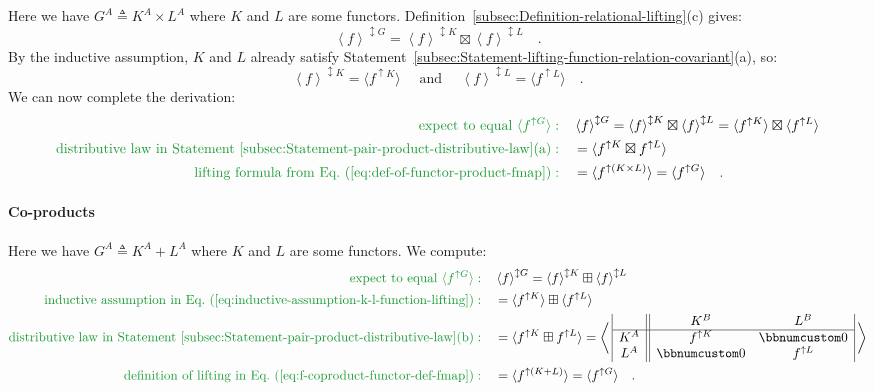 Here we have $G^{A}\triangleq K^{A}\times L^{A}$ where $K$ and $L$
are some functors. Definition~\ref{subsec:Definition-relational-lifting}(c)
gives:
\[
\left<f\right>^{\updownarrow G}=\left<f\right>^{\updownarrow K}\boxtimes\left<f\right>^{\updownarrow L}\quad.
\]
By the inductive assumption, $K$ and $L$ already satisfy Statement~\ref{subsec:Statement-lifting-function-relation-covariant}(a),
so:
\begin{equation}
\left<f\right>^{\updownarrow K}=\langle f^{\uparrow K}\rangle\quad\text{ and }\quad\left<f\right>^{\updownarrow L}=\langle f^{\uparrow L}\rangle\quad.\label{eq:inductive-assumption-k-l-function-lifting}
\end{equation}
We can now complete the derivation:
\begin{align*}
{\color{greenunder}\text{expect to equal }\langle f^{\uparrow G}\rangle:}\quad & \left<f\right>^{\updownarrow G}=\left<f\right>^{\updownarrow K}\boxtimes\left<f\right>^{\updownarrow L}=\langle f^{\uparrow K}\rangle\boxtimes\langle f^{\uparrow L}\rangle\\
{\color{greenunder}\text{distributive law in Statement~\ref{subsec:Statement-pair-product-distributive-law}(a)}:}\quad & =\langle f^{\uparrow K}\boxtimes f^{\uparrow L}\rangle\\
{\color{greenunder}\text{lifting formula from Eq.~(\ref{eq:def-of-functor-product-fmap})}:}\quad & =\langle f^{\uparrow(K\times L)}\rangle=\langle f^{\uparrow G}\rangle\quad.
\end{align*}


\paragraph{Co-products}

Here we have $G^{A}\triangleq K^{A}+L^{A}$ where $K$ and $L$ are
some functors. We compute:
\begin{align*}
{\color{greenunder}\text{expect to equal }\langle f^{\uparrow G}\rangle:}\quad & \left<f\right>^{\updownarrow G}=\left<f\right>^{\updownarrow K}\boxplus\left<f\right>^{\updownarrow L}\\
{\color{greenunder}\text{inductive assumption in Eq.~(\ref{eq:inductive-assumption-k-l-function-lifting})}:}\quad & =\langle f^{\uparrow K}\rangle\boxplus\langle f^{\uparrow L}\rangle\\
{\color{greenunder}\text{distributive law in Statement~\ref{subsec:Statement-pair-product-distributive-law}(b)}:}\quad & =\langle f^{\uparrow K}\boxplus f^{\uparrow L}\rangle=\bigg<\,\begin{array}{|c||cc|}
 & K^{B} & L^{B}\\
\hline K^{A} & f^{\uparrow K} & \bbnum 0\\
L^{A} & \bbnum 0 & f^{\uparrow L}
\end{array}\,\bigg>\\
{\color{greenunder}\text{definition of lifting in Eq.~(\ref{eq:f-coproduct-functor-def-fmap})}:}\quad & =\langle f^{\uparrow(K+L)}\rangle=\langle f^{\uparrow G}\rangle\quad.
\end{align*}


